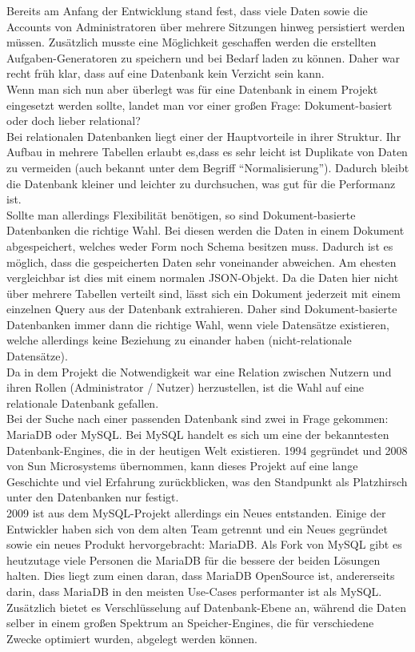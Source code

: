 Bereits am Anfang der Entwicklung stand fest, dass viele Daten sowie die Accounts von Administratoren über mehrere Sitzungen hinweg persistiert werden müssen. Zusätzlich musste eine Möglichkeit geschaffen werden die erstellten Aufgaben-Generatoren zu speichern und bei Bedarf laden zu können. Daher war recht früh klar, dass auf eine Datenbank kein Verzicht sein kann. \\

Wenn man sich nun aber überlegt was für eine Datenbank in einem Projekt eingesetzt werden sollte, landet man vor einer großen Frage: Dokument-basiert oder doch lieber relational? \\
Bei relationalen Datenbanken liegt einer der Hauptvorteile in ihrer Struktur. Ihr Aufbau in mehrere Tabellen erlaubt es,dass es sehr leicht ist Duplikate von Daten zu vermeiden (auch bekannt unter dem Begriff ``Normalisierung''). Dadurch bleibt die Datenbank kleiner und leichter zu durchsuchen, was gut für die Performanz ist. \\

Sollte man allerdings Flexibilität benötigen, so sind Dokument-basierte Datenbanken die richtige Wahl. Bei diesen werden die Daten in einem Dokument abgespeichert, welches weder Form noch Schema besitzen muss. Dadurch ist es möglich, dass die gespeicherten Daten sehr voneinander abweichen. Am ehesten vergleichbar ist dies mit einem normalen JSON-Objekt. Da die Daten hier nicht über mehrere Tabellen verteilt sind, lässt sich ein Dokument jederzeit mit einem einzelnen Query aus der Datenbank extrahieren. Daher sind Dokument-basierte Datenbanken immer dann die richtige Wahl, wenn viele Datensätze existieren, welche allerdings keine Beziehung zu einander haben (nicht-relationale Datensätze). \\

Da in dem Projekt die Notwendigkeit war eine Relation zwischen Nutzern und ihren Rollen (Administrator / Nutzer) herzustellen, ist die Wahl auf eine relationale Datenbank gefallen. \\

Bei der Suche nach einer passenden Datenbank sind zwei in Frage gekommen: MariaDB oder MySQL. Bei MySQL handelt es sich um eine der bekanntesten Datenbank-Engines, die in der heutigen Welt existieren. 1994 gegründet und 2008 von Sun Microsystems übernommen, kann dieses Projekt auf eine lange Geschichte und viel Erfahrung zurückblicken, was den Standpunkt als Platzhirsch unter den Datenbanken nur festigt. \\
2009 ist aus dem MySQL-Projekt allerdings ein Neues entstanden. Einige der Entwickler haben sich von dem alten Team getrennt und ein Neues gegründet sowie ein neues Produkt hervorgebracht: MariaDB. Als Fork von MySQL gibt es heutzutage viele Personen die MariaDB für die bessere der beiden Lösungen halten. Dies liegt zum einen daran, dass MariaDB OpenSource ist, andererseits darin, dass MariaDB in den meisten Use-Cases performanter ist als MySQL. Zusätzlich bietet es Verschlüsselung auf Datenbank-Ebene an, während die Daten selber in einem großen Spektrum an Speicher-Engines, die für verschiedene Zwecke optimiert wurden, abgelegt werden können. \\

